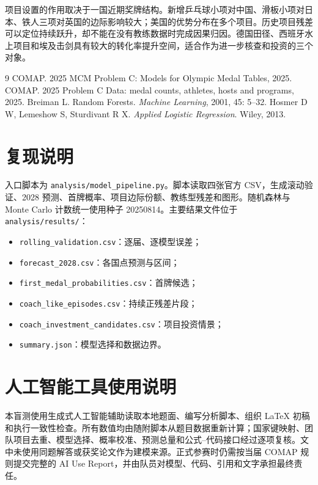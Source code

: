 \documentclass[UTF8,11pt,a4paper]{ctexart}
\begin{document}
项目设置的作用取决于一国近期奖牌结构。新增乒乓球小项对中国、滑板小项对日本、铁人三项对英国的边际影响较大；美国的优势分布在多个项目。历史项目残差可以定位持续跃升，却不能在没有教练数据时完成因果归因。德国田径、西班牙水上项目和埃及击剑具有较大的转化率提升空间，适合作为进一步核查和投资的三个对象。

\begin{thebibliography}{9}
 COMAP. 2025 MCM Problem C: Models for Olympic Medal Tables, 2025.
 COMAP. 2025 Problem C Data: medal counts, athletes, hosts and programs, 2025.
 Breiman L. Random Forests. \emph{Machine Learning}, 2001, 45: 5--32.
 Hosmer D W, Lemeshow S, Sturdivant R X. \emph{Applied Logistic Regression}. Wiley, 2013.
\end{thebibliography}

\appendix
\section{复现说明}

入口脚本为 \texttt{analysis/model\_pipeline.py}。脚本读取四张官方 CSV，生成滚动验证、2028 预测、首牌概率、项目边际份额、教练型残差和图形。随机森林与 Monte Carlo 计数统一使用种子 20250814。主要结果文件位于 \texttt{analysis/results/}：
\begin{itemize}
\item \texttt{rolling\_validation.csv}：逐届、逐模型误差；
\item \texttt{forecast\_2028.csv}：各国点预测与区间；
\item \texttt{first\_medal\_probabilities.csv}：首牌候选；
\item \texttt{coach\_like\_episodes.csv}：持续正残差片段；
\item \texttt{coach\_investment\_candidates.csv}：项目投资情景；
\item \texttt{summary.json}：模型选择和数据边界。
\end{itemize}

\section{人工智能工具使用说明}

本盲测使用生成式人工智能辅助读取本地题面、编写分析脚本、组织 LaTeX 初稿和执行一致性检查。所有数值均由随附脚本从题目数据重新计算；国家键映射、团队项目去重、模型选择、概率校准、预测总量和公式--代码接口经过逐项复核。文中未使用同题解答或获奖论文作为建模来源。正式参赛时仍需按当届 COMAP 规则提交完整的 AI Use Report，并由队员对模型、代码、引用和文字承担最终责任。
\end{document}
